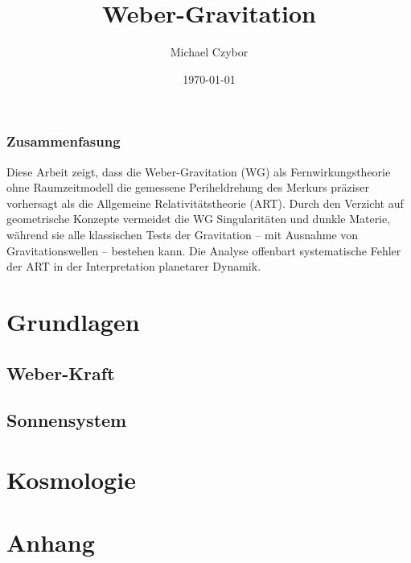 \documentclass{book}
\numberwithin{equation}{section}
\begin{document}
\title{Weber-Gravitation}
\author{Michael Czybor}
\date{\today}
\maketitle

\section*{Zusammenfasung}
Diese Arbeit zeigt, dass die Weber-Gravitation (WG) als Fernwirkungstheorie ohne Raumzeitmodell die gemessene Periheldrehung des Merkurs präziser vorhersagt als die Allgemeine Relativitätstheorie (ART). Durch den Verzicht auf geometrische Konzepte vermeidet die WG Singularitäten und dunkle Materie, während sie alle klassischen Tests der Gravitation – mit Ausnahme von Gravitationswellen – bestehen kann. Die Analyse offenbart systematische Fehler der ART in der Interpretation planetarer Dynamik.

\tableofcontents

\part{Grundlagen}
\chapter{Weber-Kraft}





\chapter{Sonnensystem}


\part{Kosmologie}

\part{Anhang}


\end{document}
